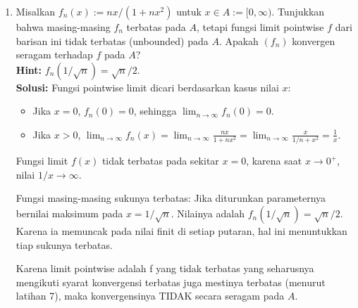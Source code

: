 ﻿\documentclass{article}
\begin{document}
\begin{enumerate}
        \vspace{0.5cm}
  \item[8.] Misalkan $f_n(x) := nx / (1 + nx^2)$ untuk $x \in A := [0, \infty)$. Tunjukkan bahwa masing-masing $f_n$ terbatas pada $A$, tetapi fungsi limit pointwise $f$ dari barisan ini tidak terbatas (unbounded) pada $A$. Apakah $(f_n)$ konvergen seragam terhadap $f$ pada $A$?\\
        \textbf{Hint:} $f_n(1/\sqrt{n}) = \sqrt{n}/2$.\\
        \textbf{Solusi:}
        Fungsi pointwise limit dicari berdasarkan kasus nilai $x$:
        \begin{itemize}
          \item Jika $x = 0$, $f_n(0) = 0$, sehingga $\lim_{n \to \infty} f_n(0) = 0$.
          \item Jika $x > 0$, $\lim_{n \to \infty} f_n(x) = \lim_{n \to \infty} \frac{nx}{1+nx^2} = \lim_{n \to \infty} \frac{x}{1/n + x^2} = \frac{1}{x}$.
        \end{itemize}
        Fungsi limit $f(x)$ tidak terbatas pada sekitar $x=0$, karena saat $x \to 0^+$, nilai $1/x \to \infty$.

        Fungsi masing-masing sukunya terbatas: Jika diturunkan parameternya bernilai maksimum pada $x = 1/\sqrt{n}$. Nilainya adalah $f_n(1/\sqrt{n}) = \sqrt{n}/2$. Karena ia memuncak pada nilai finit di setiap putaran, hal ini menuntukkan tiap sukunya terbatas.

        Karena limit pointwise adalah f yang tidak terbatas yang seharusnya mengikuti syarat konvergensi terbatas juga mestinya terbatas (menurut latihan 7), maka konvergensinya TIDAK secara seragam pada $A$.


\end{enumerate}
\end{document}
